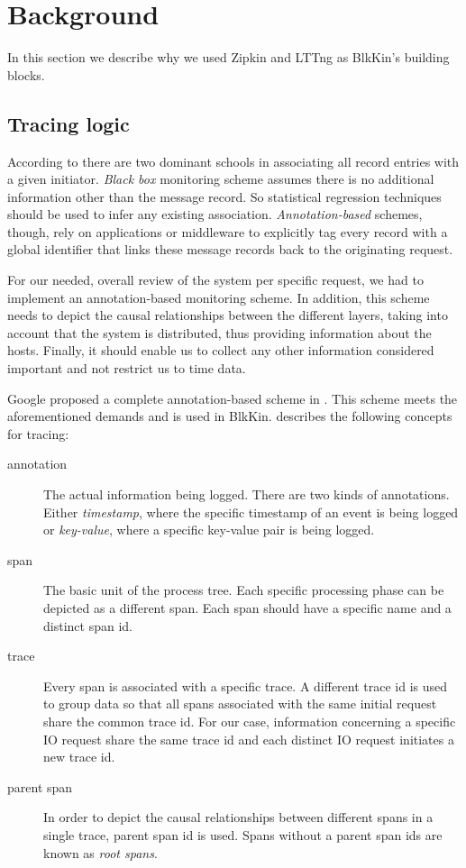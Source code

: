 \documentclass[a4paper,10pt,twocolumn]{article}
\begin{document}
\section{Background}
In this section we describe why we used Zipkin and LTTng as BlkKin's building
blocks.

\subsection{Tracing logic}
According to \cite{dapper} there are two dominant schools in associating all
record entries with a given initiator. \emph{Black box} monitoring scheme
assumes there is no additional information other than the message record. So
statistical regression techniques should be used to infer any existing
association. \emph{Annotation-based} schemes, though, rely on applications or
middleware to explicitly tag every record with a global identifier that links
these message records back to the originating request. 

For our needed, overall review of the system per specific request, we had to
implement an annotation-based monitoring scheme. In addition, this scheme needs
to depict the causal relationships between the different layers, taking into
account that the system is distributed, thus providing information about the
hosts. Finally, it should enable us to collect any other information considered
important and not restrict us to time data.

Google proposed a complete annotation-based scheme in \cite{dapper}.
This scheme meets the aforementioned demands and is used in
BlkKin. \cite{dapper} describes the following concepts for tracing:

\begin{description}
\item[annotation]
The actual information being logged. There are two kinds of annotations. Either
\emph{timestamp}, where the specific timestamp of an event is being logged or
\emph{key-value}, where a specific key-value pair is being logged.
\item[span]
The basic unit of the process tree. Each specific processing phase can be
depicted as a different span. Each span should have a specific name and a
distinct span id.
\item[trace]
Every span is associated with a specific trace. A different trace id is used to
group data so that all spans associated with the same initial request share the
common trace id. For our case, information concerning a specific IO request
share the same trace id and each distinct IO request initiates a new trace id.
\item[parent span] 
In order to depict the causal relationships between different spans in a single
trace, parent span id is used. Spans without a parent span ids are  known as 
\emph{root spans}.
\end{description}
\end{document}
